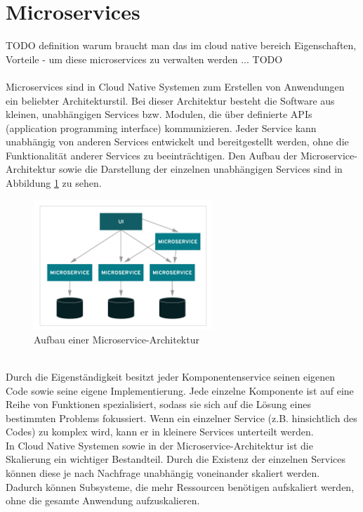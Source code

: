 \section{Microservices}
TODO definition
warum braucht man das im cloud native bereich
Eigenschaften, Vorteile
- um diese microservices zu verwalten werden ... TODO\\
\\
Microservices sind in Cloud Native Systemen zum Erstellen von Anwendungen ein beliebter Architekturstil. Bei dieser Architektur besteht die Software aus kleinen, unabhängigen Services bzw. Modulen, die über definierte APIs (application programming interface) kommunizieren. Jeder Service kann unabhängig von anderen Services entwickelt und bereitgestellt werden, ohne die Funktionalität anderer Services zu beeinträchtigen. Den Aufbau der Microservice-Architektur sowie die Darstellung der einzelnen unabhängigen Services sind in Abbildung \ref{micro} zu sehen.\\
\begin{figure}[bth] 
	\centering
	\includegraphics[width=0.6\textwidth]{Graphics/Microservice.png}
	\caption{Aufbau einer Microservice-Architektur}
	\label{micro}
\end{figure}\\
Durch die Eigenständigkeit besitzt jeder Komponentenservice seinen eigenen Code sowie seine eigene Implementierung. Jede einzelne Komponente ist auf eine Reihe von Funktionen spezialisiert, sodass sie sich auf die Lösung eines bestimmten Problems fokussiert. Wenn ein einzelner Service (z.B. hinsichtlich des Codes) zu komplex wird, kann er in kleinere Services unterteilt werden.\\
In Cloud Native Systemen sowie in der Microservice-Architektur ist die Skalierung ein wichtiger Bestandteil. Durch die Existenz der einzelnen Services können diese je nach Nachfrage unabhängig voneinander skaliert werden. Dadurch können Subsysteme, die mehr Ressourcen benötigen aufskaliert werden, ohne die gesamte Anwendung aufzuskalieren.\\
